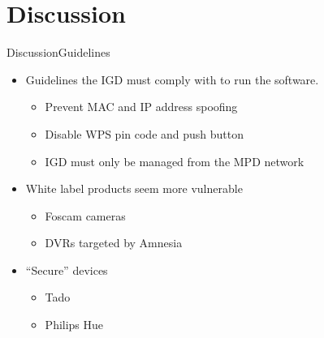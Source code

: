\section{Discussion}

\begin{frame}{Discussion}{Guidelines}
\begin{itemize}
\item Guidelines the IGD must comply with to run the software.
	\begin{itemize}
		\item Prevent MAC and IP address spoofing
		\item Disable WPS pin code and push button
		\item IGD must only be managed from the MPD network
	\end{itemize}
	\item White label products seem more vulnerable
	\begin{itemize}
		\item Foscam cameras
		\item DVRs targeted by Amnesia
	\end{itemize}
	\item ``Secure'' devices
	\begin{itemize}
		\item Tado
		\item Philips Hue
	\end{itemize}
\end{itemize}

\end{frame}

